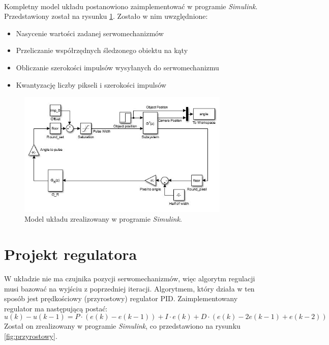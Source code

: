 \paragraph*{}
Kompletny model układu postanowiono zaimplementować w programie \textit{Simulink}. Przedstawiony został na rysunku \ref{fig:simulink}. Zostało w nim uwzględnione:
\begin{itemize}
\item Nasycenie wartości zadanej serwomechanizmów
\item Przeliczanie współrzędnych śledzonego obiektu na kąty
\item Obliczanie szerokości impulsów wysyłanych do serwomechanizmu
\item Kwantyzację liczby pikseli i szerokości impulsów
\end{itemize}

\begin{figure}[h]
	\centering
	\includegraphics[width=4in]{Simulink.jpg}
	\caption{Model układu zrealizowany w programie \textit{Simulink}.}
	\label{fig:simulink}
\end{figure}

\section{Projekt regulatora}
\label{sec:projektregulatora}

W układzie nie ma czujnika pozycji serwomechanizmów, więc algorytm regulacji musi bazować na wyjściu z poprzedniej iteracji.
Algorytmem, który działa w ten sposób jest prędkościowy (przyrostowy) regulator PID.
Zaimplementowany regulator ma następującą postać:
\begin{equation}
u(k)-u(k-1)=P \cdot (e(k)-e(k-1))+I \cdot e(k)+D \cdot (e(k)-2e(k-1)+e(k-2))
\end{equation}
Został on zrealizowany w programie \textit{Simulink}, co przedstawiono na rysunku \ref{fig:przyrostowy}.

